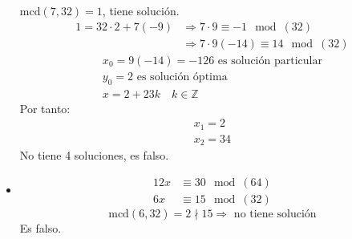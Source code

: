 \begin{ejercicio}
\begin{itemize}
            $\text{mcd}(7,32)=1$, tiene solución.
            \begin{align*}
                1 = 32\cdot 2+7(-9) &\Longrightarrow 7\cdot 9\equiv -1\mod (32) \\
                                    &\Longrightarrow 7\cdot 9(-14)\equiv 14\mod(32)
            \end{align*}
            \begin{gather*}
                x_0 = 9(-14) = -126 \text{\ es\ solución\ particular} \\
                y_0 = 2 \text{\ es\ solución\ óptima} \\
                x = 2+23k\quad k\in \mathbb{Z}
            \end{gather*}
            Por tanto:
            \begin{gather*}
                x_1 = 2 \\
                x_2 = 34
            \end{gather*}
            No tiene 4 soluciones, es falso.
            
        \item 
            \begin{align*}
                12x &\equiv 30\mod(64) \\
                6x &\equiv 15\mod(32)
            \end{align*}
            \begin{equation*}
                \text{mcd}(6,32) = 2 \nmid 15 \Longrightarrow \text{\ no\ tiene\ solución}
            \end{equation*}
            Es falso.
    \end{itemize}
\end{ejercicio}

